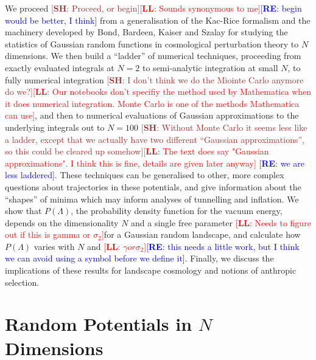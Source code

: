 \documentclass[12pt]{article}
\newcommand{\re}[1]{\textcolor{blue}{[{\bf RE}: #1]}}
\newcommand{\lfl}[1]{\textcolor{red}{[{\bf LL}: #1]}}
\newcommand{\SH}[1]{\textcolor{brown}{[{\bf SH}: #1]}}
\begin{document}
We proceed \SH{Proceed, or begin}\lfl{Sounds synonymous to me}\re{begin would be better, I think} from a generalisation of the Kac-Rice formalism \cite{Kac1943,Rice1945} and the  machinery developed by Bond, Bardeen, Kaiser and Szalay  \cite{BBKS}  for studying the statistics of Gaussian random functions in  cosmological perturbation theory   to $N$ dimensions.  We then build a ``ladder'' of numerical techniques, proceeding from exactly evaluated integrals at $N=2$ to semi-analytic integration at small $N$, to fully numerical integration \SH{I don't think we do the Miointe Carlo anymore do we?}\lfl{Our notebooks don't specifiy the method used by Mathematica when it does numerical integration. Monte Carlo is one of the methods Mathematica can use}, and then to numerical evaluations of Gaussian approximations to the underlying integrals out to $N=100$ \SH{Without Monte Carlo it seems less like a ladder, except that we actually have two different ``Gaussian approximations'', so this could be cleared up somehow}\lfl{The text does say "Gaussian approximations". I think this is fine, details are given later anyway} \re{we are less laddered}. These techniques can be generalised to other, more complex questions about trajectories in these potentials, and give information about the ``shapes'' of minima which may inform analyses of tunnelling and inflation. We show that $P(\Lambda)$, the probability density function for the vacuum energy, depends on the dimensionality $N$ and a single free parameter \lfl{Needs to figure out if this is gamma or $\sigma_2$}for a Gaussian random landscape, and calculate how $P(\Lambda)$ varies with $N$ and \lfl{$\gamma or \sigma_2$}\re{this needs a little work, but I think we can avoid using a symbol before we define it}. Finally, we discuss the implications of these results for landscape cosmology and notions of anthropic selection. 

\section{Random Potentials in $N$ Dimensions}
\end{document}
